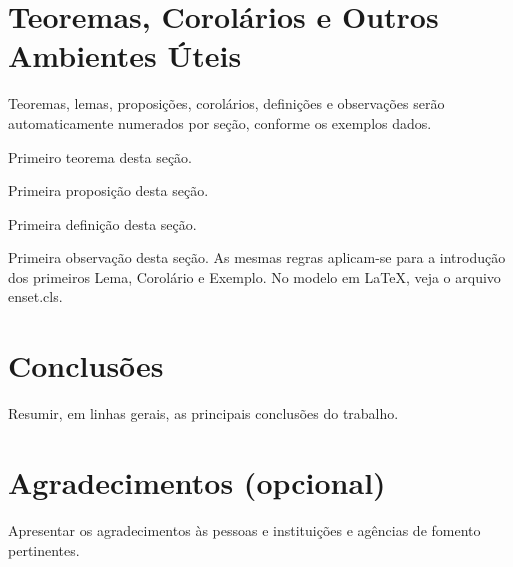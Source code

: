 \documentclass{enset}
\begin{document}

\section{Teoremas, Corolários e Outros Ambientes Úteis}\label{sec4}

Teoremas, lemas, proposições, corolários, definições e observações serão automaticamente numerados por seção, conforme os exemplos dados. 

\begin{teorema}\label{sec3_teo1}
Primeiro teorema desta seção.
\end{teorema}

\begin{prop}\label{sec3_prop1}
Primeira proposição desta seção.
\end{prop}

\begin{defi}\label{sec3_defi1}
Primeira definição desta seção.
\end{defi}

\begin{obs}\label{sec3_obs1}
Primeira observação desta seção. As mesmas regras aplicam-se para a 
introdução dos primeiros Lema, Corolário e Exemplo. No modelo em LaTeX, veja o arquivo enset.cls.
\end{obs}


\section{Conclusões}
Resumir, em linhas gerais, as principais conclusões do trabalho. 

\section*{Agradecimentos (opcional)}
Apresentar os agradecimentos às pessoas e instituições e agências de fomento pertinentes.
\end{document}
